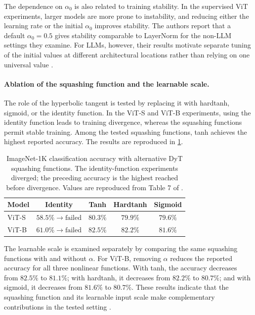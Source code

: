 The dependence on \(\alpha_0\) is also related to training stability.
In the supervised ViT experiments, larger models are more prone to
instability, and reducing either the learning rate or the initial
\(\alpha_0\) improves stability. The authors report that a default
\(\alpha_0=0.5\) gives stability comparable to LayerNorm for the
non-LLM settings they examine. For LLMs, however, their results motivate
separate tuning of the initial values at different architectural
locations rather than relying on one universal value
\parencite{zhu2025dyt}.

\paragraph{Ablation of the squashing function and the learnable scale.}
The role of the hyperbolic tangent is tested by replacing it with
hardtanh, sigmoid, or the identity function. In the ViT-S and ViT-B
experiments, using the identity function leads to training divergence,
whereas the squashing functions permit stable training. Among the
tested squashing functions, tanh achieves the highest reported accuracy.
The results are reproduced in
\cref{tab:norm-squashing-ablation}.

\begin{table}[htbp]
    \centering
    \caption{ImageNet-1K classification accuracy with alternative DyT
    squashing functions. The identity-function experiments diverged;
    the preceding accuracy is the highest reached before divergence.
    Values are reproduced from Table 7 of
    \textcite{zhu2025dyt}.}
    \label{tab:norm-squashing-ablation}
    \begin{tabular}{lcccc}
        \toprule
        Model & Identity & Tanh & Hardtanh & Sigmoid \\
        \midrule
        ViT-S & \(58.5\%\rightarrow\text{failed}\)
              & \(80.3\%\) & \(79.9\%\) & \(79.6\%\) \\
        ViT-B & \(61.0\%\rightarrow\text{failed}\)
              & \(82.5\%\) & \(82.2\%\) & \(81.6\%\) \\
        \bottomrule
    \end{tabular}
\end{table}

The learnable scale is examined separately by comparing the same
squashing functions with and without \(\alpha\). For ViT-B, removing
\(\alpha\) reduces the reported accuracy for all three nonlinear
functions. With tanh, the accuracy decreases from \(82.5\%\) to
\(81.1\%\); with hardtanh, it decreases from \(82.2\%\) to \(80.7\%\);
and with sigmoid, it decreases from \(81.6\%\) to \(80.7\%\).
These results indicate that the squashing function and its learnable
input scale make complementary contributions in the tested setting
\parencite{zhu2025dyt}.

